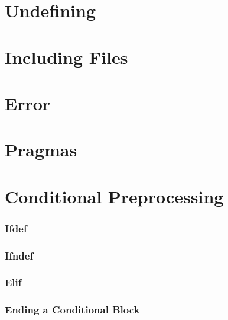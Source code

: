 \section{Undefining}

\section{Including Files}

\section{Error}

\section{Pragmas}

\section{Conditional Preprocessing}

\subsubsection{Ifdef}
\subsubsection{Ifndef}
\subsubsection{Elif}

\subsubsection{Ending a Conditional Block}


